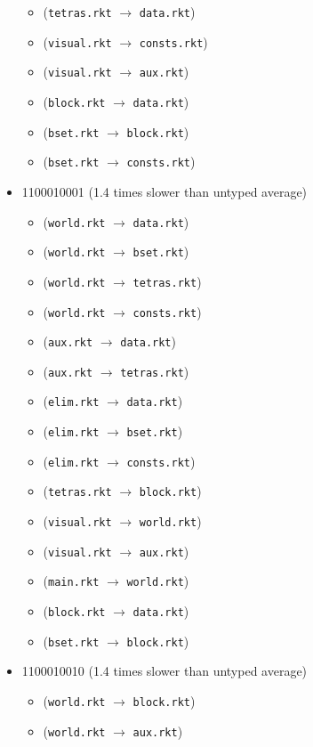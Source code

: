\documentclass{article}
\newcommand{\mono}[1]{\texttt{#1}}
\begin{document}
\begin{itemize}
\begin{itemize}
  \item (\mono{tetras.rkt} $\rightarrow$ \mono{data.rkt})
  \item (\mono{visual.rkt} $\rightarrow$ \mono{consts.rkt})
  \item (\mono{visual.rkt} $\rightarrow$ \mono{aux.rkt})
  \item (\mono{block.rkt} $\rightarrow$ \mono{data.rkt})
  \item (\mono{bset.rkt} $\rightarrow$ \mono{block.rkt})
  \item (\mono{bset.rkt} $\rightarrow$ \mono{consts.rkt})
  \end{itemize}
\item 1100010001 (1.4 times slower than untyped average)
  \begin{itemize}
  \item (\mono{world.rkt} $\rightarrow$ \mono{data.rkt})
  \item (\mono{world.rkt} $\rightarrow$ \mono{bset.rkt})
  \item (\mono{world.rkt} $\rightarrow$ \mono{tetras.rkt})
  \item (\mono{world.rkt} $\rightarrow$ \mono{consts.rkt})
  \item (\mono{aux.rkt} $\rightarrow$ \mono{data.rkt})
  \item (\mono{aux.rkt} $\rightarrow$ \mono{tetras.rkt})
  \item (\mono{elim.rkt} $\rightarrow$ \mono{data.rkt})
  \item (\mono{elim.rkt} $\rightarrow$ \mono{bset.rkt})
  \item (\mono{elim.rkt} $\rightarrow$ \mono{consts.rkt})
  \item (\mono{tetras.rkt} $\rightarrow$ \mono{block.rkt})
  \item (\mono{visual.rkt} $\rightarrow$ \mono{world.rkt})
  \item (\mono{visual.rkt} $\rightarrow$ \mono{aux.rkt})
  \item (\mono{main.rkt} $\rightarrow$ \mono{world.rkt})
  \item (\mono{block.rkt} $\rightarrow$ \mono{data.rkt})
  \item (\mono{bset.rkt} $\rightarrow$ \mono{block.rkt})
  \end{itemize}
\item 1100010010 (1.4 times slower than untyped average)
  \begin{itemize}
  \item (\mono{world.rkt} $\rightarrow$ \mono{block.rkt})
  \item (\mono{world.rkt} $\rightarrow$ \mono{aux.rkt})

\end{itemize}
\end{itemize}
\end{document}
